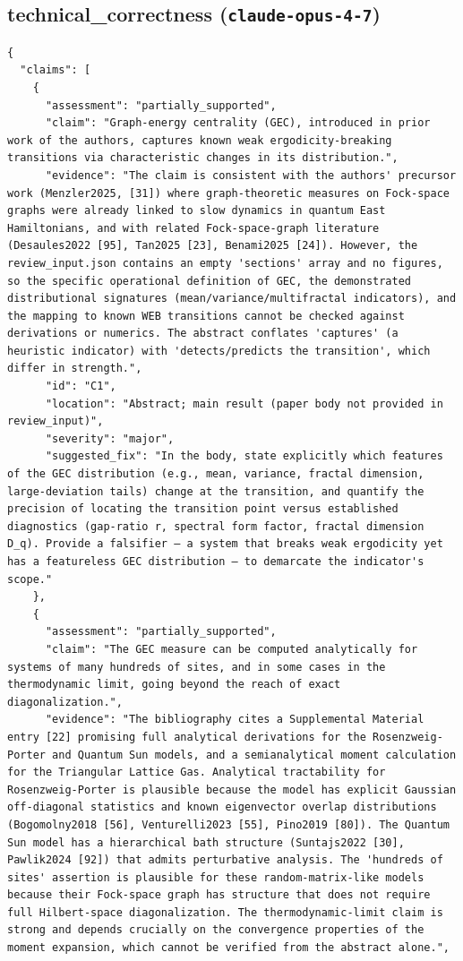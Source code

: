 \documentclass[11pt]{article}
\begin{document}
\subsection*{technical_correctness (\texttt{claude-opus-4-7})}
\begin{verbatim}
{
  "claims": [
    {
      "assessment": "partially_supported",
      "claim": "Graph-energy centrality (GEC), introduced in prior work of the authors, captures known weak ergodicity-breaking transitions via characteristic changes in its distribution.",
      "evidence": "The claim is consistent with the authors' precursor work (Menzler2025, [31]) where graph-theoretic measures on Fock-space graphs were already linked to slow dynamics in quantum East Hamiltonians, and with related Fock-space-graph literature (Desaules2022 [95], Tan2025 [23], Benami2025 [24]). However, the review_input.json contains an empty 'sections' array and no figures, so the specific operational definition of GEC, the demonstrated distributional signatures (mean/variance/multifractal indicators), and the mapping to known WEB transitions cannot be checked against derivations or numerics. The abstract conflates 'captures' (a heuristic indicator) with 'detects/predicts the transition', which differ in strength.",
      "id": "C1",
      "location": "Abstract; main result (paper body not provided in review_input)",
      "severity": "major",
      "suggested_fix": "In the body, state explicitly which features of the GEC distribution (e.g., mean, variance, fractal dimension, large-deviation tails) change at the transition, and quantify the precision of locating the transition point versus established diagnostics (gap-ratio r, spectral form factor, fractal dimension D_q). Provide a falsifier — a system that breaks weak ergodicity yet has a featureless GEC distribution — to demarcate the indicator's scope."
    },
    {
      "assessment": "partially_supported",
      "claim": "The GEC measure can be computed analytically for systems of many hundreds of sites, and in some cases in the thermodynamic limit, going beyond the reach of exact diagonalization.",
      "evidence": "The bibliography cites a Supplemental Material entry [22] promising full analytical derivations for the Rosenzweig-Porter and Quantum Sun models, and a semianalytical moment calculation for the Triangular Lattice Gas. Analytical tractability for Rosenzweig-Porter is plausible because the model has explicit Gaussian off-diagonal statistics and known eigenvector overlap distributions (Bogomolny2018 [56], Venturelli2023 [55], Pino2019 [80]). The Quantum Sun model has a hierarchical bath structure (Suntajs2022 [30], Pawlik2024 [92]) that admits perturbative analysis. The 'hundreds of sites' assertion is plausible for these random-matrix-like models because their Fock-space graph has structure that does not require full Hilbert-space diagonalization. The thermodynamic-limit claim is strong and depends crucially on the convergence properties of the moment expansion, which cannot be verified from the abstract alone.",

\end{verbatim}
\end{document}
